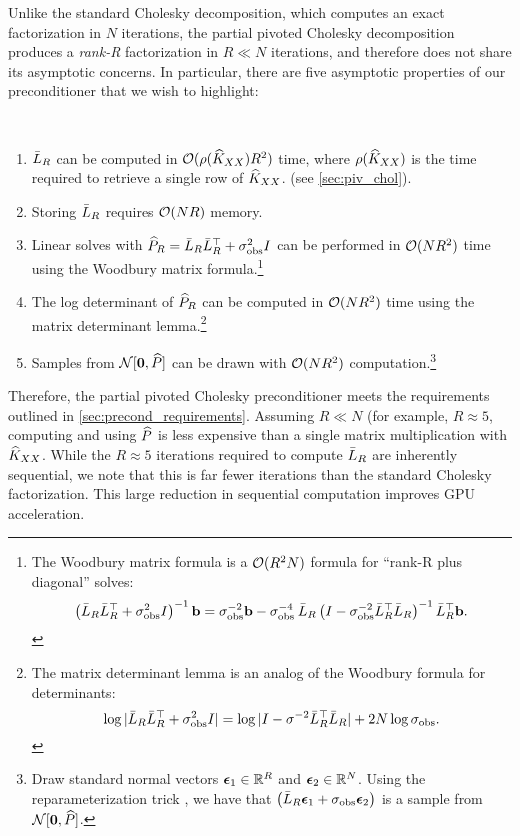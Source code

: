 Unlike the standard Cholesky decomposition, which computes an exact factorization in $N$ iterations,
the partial pivoted Cholesky decomposition produces a \emph{rank-R} factorization in $R \ll N$ iterations, and therefore does not share its asymptotic concerns.
In particular, there are five asymptotic properties of our preconditioner that we wish to highlight:
%
\begin{observation}
  {\ }
  \begin{enumerate}
    \item $\bar{L}_{R}$ can be computed in $\bigo{\row{\trainK}R^{2}}$ time, where $\rho ( \widehat{K}_{XX} )$ is the time required to retrieve a single row of $\widehat{K}_{XX}$.
      (see \cref{sec:piv_chol}).

    \item Storing $\bar{L}_{R}$ requires $\bigo{NR}$ memory.

    \item Linear solves with $\widehat{P}_R = \bar{L}_{R} \bar{L}_{R}^{\top} + \sigma_\text{obs}^{2} I$ can be performed in $\bigo{NR^{2}}$ time using the Woodbury matrix formula.\footnote{
      The Woodbury matrix formula is a $\bigo{R^2 N}$ formula for ``rank-R plus diagonal'' solves:
      $$\left( \bar{L}_{R} \bar{L}_{R}^{\top} + \sigma^{2}_\text{obs} I \right)^{-1} \mathbf{b} = {\sigma_\text{obs}^{-2}}\mathbf{b} - {\sigma_\text{obs}^{-4}} \: \bar{L}_{R} \left( I - {\sigma^{-2}_\text{obs}} \bar{L}_{R}^{\top} \bar{L}_{R} \right)^{-1} \bar{L}_{R}^{\top}\mathbf{b}.$$
    }

    \item The log determinant of $\widehat{P}_R$ can be computed in $\bigo{NR^{2}}$ time using the matrix determinant lemma.\footnote{
      The matrix determinant lemma is an analog of the Woodbury formula for determinants:
      $$\log \vert \bar{L}_{R} \bar{L}_{R}^\top + \sigma^{2}_\text{obs} I \vert = \log \vert I - {\sigma^{-2}} \bar{L}_{R}^{\top} \bar{L}_{R} \vert + 2 N \log \sigma_\text{obs}.$$
    }

  \item Samples from $\normaldist{ \bzero}{ \trainP }$ can be drawn with $\bigo{NR^2}$ computation.\footnote{
      Draw standard normal vectors $\boldsymbol{\epsilon}_1 \in \mathbb{R}^R$ and $\boldsymbol{\epsilon}_2 \in \mathbb{R}^N$.
      Using the reparameterization trick \cite{kingma2014auto}, we have that $\left( \bar{L}_R \boldsymbol{\epsilon}_1 + \sigma_\text{obs} \boldsymbol{\epsilon}_2 \right)$ is a sample from $\normaldist{ \bzero}{\trainP}$.
    }
  \end{enumerate}
\end{observation}
%
\noindent
Therefore, the partial pivoted Cholesky preconditioner meets the requirements outlined in \cref{sec:precond_requirements}.
Assuming $R \ll N$ (for example, $R \approx 5$, computing and using $\widehat{P}$ is less expensive than a single matrix multiplication with $\widehat{K}_{XX}$.
While the $R \approx 5$ iterations required to compute $\bar{L}_R$ are inherently sequential, we note that this is far fewer iterations than the standard Cholesky factorization.
This large reduction in sequential computation improves GPU acceleration.

